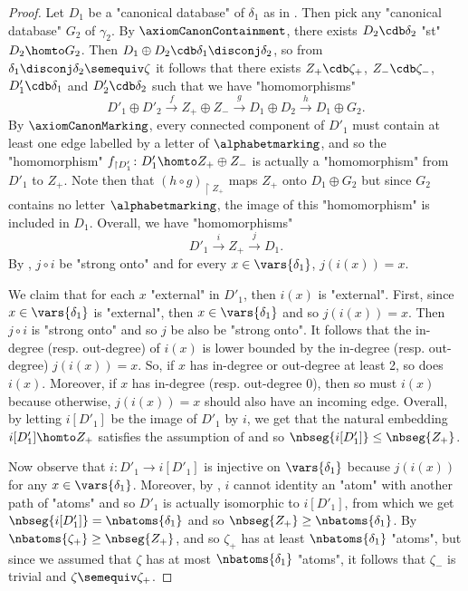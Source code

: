 \begin{proof}
	Let $D_1$ be a "canonical database" of $\delta_1$ as in \axiomCanonCore{}.
	Then pick any "canonical database" $G_2$ of $\gamma_2$.
	By $\axiomCanonContainment$, there exists $D_2 \cdb \delta_2$ "st" $D_2 \homto G_2$.
	Then $D_1 \oplus D_2 \cdb \delta_1 \disconj \delta_2$, so from $\delta_1 \disconj \delta_2 \semequiv \zeta$
	it follows that there exists $Z_+ \cdb \zeta_+$, $Z_- \cdb \zeta_-$, $D'_1 \cdb \delta_1$ and $D'_2 \cdb \delta_2$
	such that we have "homomorphisms"
	\[
		D'_1 \oplus D'_2
		\xrightarrow{f}
		Z_+ \oplus Z_-
		\xrightarrow{g}
		D_1 \oplus D_2
		\xrightarrow{h}
		D_1 \oplus G_2.
	\]
	By $\axiomCanonMarking$, every connected component of $D'_1$ must contain at least one edge labelled
	by a letter of $\alphabetmarking$, and so the "homomorphism" $f_{\restriction{D'_1}}\colon
	D'_1 \homto Z_+ \oplus Z_-$ is actually a "homomorphism" from $D'_1$ to $Z_+$.
	Note then that $(h \circ g)_{\restriction{Z_+}}$ maps $Z_+$ onto $D_1 \oplus G_2$ but
	since $G_2$ contains no letter $\alphabetmarking$, the image of this "homomorphism" is included in $D_1$.
	Overall, we have "homomorphisms"
	\[D'_1 \xrightarrow{i} Z_+ \xrightarrow{j} D_1.\] 
	By \axiomCanonCore{}, $j\circ i$ be "strong onto" and for every $x\in \vars{\delta_1}$,
	$j(i(x)) = x$.
	
	We claim that for each $x$ "external" in $D'_1$, then $i(x)$ is "external".
	First, since $x \in \vars{\delta_1}$ is "external", then $x \in \vars{\delta_1}$
	and so $j(i(x)) = x$. Then $j \circ i$ is "strong onto" and so $j$ be also be
	"strong onto". It follows that the in-degree (resp. out-degree) of $i(x)$
	is lower bounded by the in-degree (resp. out-degree) $j(i(x)) = x$.
	So, if $x$ has in-degree or out-degree at least 2, so does $i(x)$.
	Moreover, if $x$ has in-degree (resp. out-degree 0), then 
	so must $i(x)$ because otherwise, $j(i(x)) = x$ should also have an incoming edge.
	Overall, by letting $i[D'_1]$ be the image of $D'_1$ by $i$,
	we get that the natural embedding $i[D'_1] \homto Z_+$ satisfies the assumption
	of  and so $\nbseg{i[D'_1]} \leq \nbseg{Z_+}$.
	
	Now observe that $i\colon D'_1 \to i[D'_1]$ is injective on $\vars{\delta_1}$
	because $j(i(x))$ for any $x\in \vars{\delta_1}$.
	Moreover, by \axiomCanonNonRed{}, $i$ cannot identity an "atom" with another path of "atoms" and so $D'_1$ is actually isomorphic to $i[D'_1]$, from which we
	get $\nbseg{i[D'_1]} = \nbatoms{\delta_1}$
	and so $\nbseg{Z_+} \geq \nbatoms{\delta_1}$.
	By  $\nbatoms{\zeta_+} \geq \nbseg{Z_+}$, and so $\zeta_+$ has at least $\nbatoms{\delta_1}$
	"atoms", but since we assumed that $\zeta$ has at most $\nbatoms{\delta_1}$ "atoms",
	it follows that $\zeta_-$ is trivial and $\zeta \semequiv \zeta_+$.
	

\end{proof}
